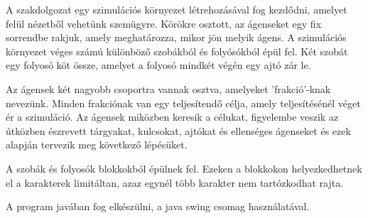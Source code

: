 
A szakdolgozat egy szimulációs környezet létrehozásával fog kezdődni, amelyet felül nézetből vehetünk szemügyre.
Körökre osztott, az ágenseket egy fix sorrendbe rakjuk, amely meghatározza, mikor jön melyik ágens.
A szimulációs környezet véges számú különböző szobákból és folyósókból épül fel. Két szobát egy folyosó köt össze, amelyet a folyosó mindkét végén egy ajtó zár le. 

Az ágensek két nagyobb csoportra vannak osztva, amelyeket 'frakció'-knak nevezünk. Minden frakciónak van egy teljesítendő célja, amely teljesítésénél véget ér a szimuláció.
Az ágensek miközben keresik a célukat, figyelembe veszik az útközben észrevett tárgyakat, kulcsokat, ajtókat és ellenséges ágenseket és ezek alapján tervezik meg következő lépésüket.

A szobák és folyosók blokkokból épülnek fel. Ezeken a blokkokon helyezkedhetnek el a karakterek limitáltan, azaz egynél több karakter nem tartózkodhat rajta.

A program javában \cite{java} fog elkészülni, a java swing csomag \cite{javaswing} használatával.